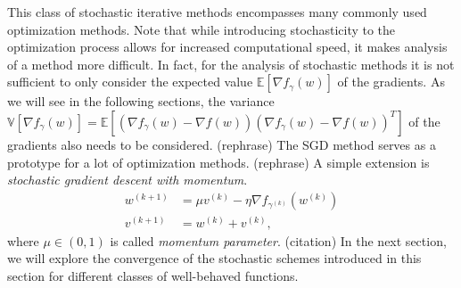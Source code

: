 \documentclass[12pt]{article}
\theoremstyle{definition}
\numberwithin{equation}{section}
\begin{document}
This class of stochastic iterative methods encompasses many commonly used optimization methods. Note that while introducing stochasticity to the optimization process allows for increased computational speed, it makes analysis of a method more difficult. In fact, for the analysis of stochastic methods it is not sufficient to only consider the expected value $\mathbb{E}[\nabla f_{\gamma}(w)]$ of the gradients. As we will see in the following sections, the variance $\mathbb{V}[\nabla f_{\gamma}(w)] = \mathbb{E}[(\nabla f_{\gamma}(w) - \nabla f(w)){(\nabla f_{\gamma}(w) - \nabla f(w))}^T]$ of the gradients also needs to be considered. (rephrase)
The SGD method serves as a prototype for a lot of optimization methods. (rephrase) A simple extension is \emph{stochastic gradient descent with momentum}. 
\begin{align*}
  w^{(k+1)} &= \mu v^{(k)} - \eta \nabla f_{\gamma^{(k)}}(w^{(k)}) \\
  v^{(k+1)} &= w^{(k)} + v^{(k)},
\end{align*}
where $\mu \in (0,1)$ is called \emph{momentum parameter}. (citation)
In the next section, we will explore the convergence of the stochastic schemes introduced in this section for different classes of well-behaved functions.
\end{document}

